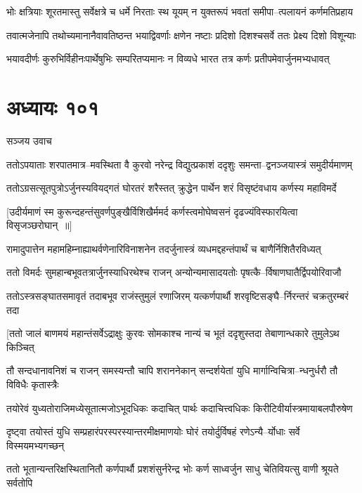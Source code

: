 \twolineshloka
{भोः क्षत्रियाः शूरतमास्तु सर्वेक्षत्रे च धर्मे निरताः स्थ यूयम्}
{न युक्तरूपं भवतां समीपा--त्पलायनं कर्णमतिप्रहाय}


\twolineshloka
{तवात्मजेनापि तथोच्यमानानैवावतिष्ठन्त भयाद्विवर्णाः}
{क्षणेन नष्टाः प्रदिशो दिशश्चसर्वे ततः प्रेक्ष्य दिशो विशून्याः}


\twolineshloka
{भयावदीर्णः कुरुभिर्विहीनःपार्थेषुभिः सम्परितप्यमानः}
{न विव्यधे भारत तत्र कर्णः प्रतीपमेवार्जुनमभ्यधावत्}


\chapter{अध्यायः १०१}
\twolineshloka
{सञ्जय उवाच}
{}


\twolineshloka
{ततोऽपयाताः शरपातमात्र--मवस्थिता वै कुरवो नरेन्द्र}
{विद्युत्प्रकाशं ददृशुः समन्ता--द्वनञ्जयास्त्रं समुदीर्यमाणम्}


\twolineshloka
{ततोऽग्रसत्सूतपुत्रोऽर्जुनस्यवियद्गतं घोरतरं शरैस्तत्}
{क्रुद्धेन पार्थेन शरं विसृष्टंवधाय कर्णस्य महाविमर्दे}


\twolineshloka
{[उदीर्यमाणं स्म कुरून्दहन्तंसुवर्णपुङ्खैर्विशिखैर्ममर्द}
{कर्णस्त्वमोघेष्वसनं दृढज्यंविस्फारयित्वा विसृजञ्छरोघान् ॥]}


\twolineshloka
{रामादुपात्तेन महामहिम्नाह्याथर्वणेनारिविनाशनेन}
{तदर्जुनास्त्रं व्यधमद्दहन्तंपार्थं च बाणैर्निशितैरविध्यत्}


\twolineshloka
{ततो विमर्दः सुमहान्बभूवतत्रार्जुनस्याधिरथेश्च राजन्}
{अन्योन्यमासादयतोः पृषत्कै--र्विषाणघातैर्द्विपयोरिवाजौ}


\twolineshloka
{ततोऽस्त्रसङ्घातसमावृतं तदाबभूव राजंस्तुमुलं रणाजिरम्}
{यत्कर्णपार्थौ शरवृष्टिसङ्घै--र्निरन्तरं चक्रतुरम्बरं तदा}


\twolineshloka
{[ततो जालं बाणमयं महान्तंसर्वेऽद्राक्षुः कुरवः सोमकाश्च}
{नान्यं च भूतं ददृशुस्तदा तेबाणान्धकारे तुमुलेऽथ किञ्चित्}


\threelineshloka
{तौ सन्दधानावनिशं च राजन्}
{समस्यन्तौ चापि शराननेकान्}
{सन्दर्शयेतां युधि मार्गान्विचित्रा--न्धनुर्धरौ तौ विविधैः कृतास्त्रैः}


\twolineshloka
{तयोरेवं युध्यतोराजिमध्येसूतात्मजोऽभूदधिकः कदाचित्}
{पार्थः कदाचित्त्वधिकः किरीटिवीर्यास्त्रमायाबलपौरुषेण}


\twolineshloka
{दृष्ट्वा तयोस्तं युधि सम्प्रहारंपरस्परस्यान्तरमीक्षमाणयोः}
{घोरं तयोर्दुर्विषहं रणेऽन्यै--र्योधाः सर्वे विस्मयमभ्यगच्छन्}


\twolineshloka
{ततो भूतान्यन्तरिक्षस्थितानितौ कर्णपार्थौ प्रशशंसुर्नरेन्द्र}
{भोः कर्ण साध्वर्जुन साधु चेतिवियत्सु वाणी श्रूयते सर्वतोपि}


